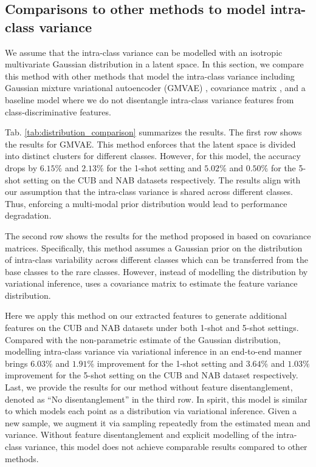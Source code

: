 \documentclass[10pt,twocolumn,letterpaper]{article}
\begin{document}
\subsection{Comparisons to other methods to model intra-class variance}

We assume that the intra-class variance can be modelled with an isotropic multivariate Gaussian distribution in a latent space.
In this section, we compare this method with other methods that model the intra-class variance including Gaussian mixture variational autoencoder (GMVAE) \cite{gmm_vae}, covariance matrix \cite{feature_transfer}, and a baseline model where we do not disentangle intra-class variance features from class-discriminative features.

Tab. \ref{tab:distribution_comparison} summarizes the results. The first row shows the results for GMVAE. This method enforces that the latent space is divided into distinct clusters for different classes. However, for this model, the accuracy drops by $6.15\%$ and $2.13\%$ for the 1-shot setting and $5.02\%$ and $0.50\%$ for the 5-shot setting on the CUB and NAB datasets respectively. The results align with our assumption that the intra-class variance is shared across different classes. Thus, enforcing a multi-modal prior distribution would lead to performance degradation. 

The second row shows the results for the method proposed in \cite{feature_transfer} based on covariance matrices.
Specifically, this method assumes a Gaussian prior on the distribution of intra-class variability across different classes which can be transferred from the base classes to the rare classes.
However, instead of modelling the distribution by variational inference, \cite{feature_transfer} uses a covariance matrix to estimate the feature variance distribution.
\begin{comment}
The augmented feature can then be calculated via:
$g_i = c_i + QQ^T(g_j-c_j)$, where $g_j$ and $c_j$ are the feature-level sample and the center of a regular class $j$.
$c_i$ is the feature center of an under-presented class $i$ and $g_i$ is the augmented feature for class $i$.
$Q$ is the estimated covariance matrix after PCA projection.
\end{comment}
Here we apply this method on our extracted features to generate additional features on the CUB and NAB datasets under both 1-shot and 5-shot settings.
Compared with the non-parametric estimate of the Gaussian distribution, modelling intra-class variance via variational inference in an end-to-end manner brings $6.03\%$ and $1.91\%$ improvement for the  1-shot setting and $3.64\%$ and $1.03\%$ improvement for the 5-shot setting on the CUB and NAB dataset respectively.
Last, we provide the results for our method without  feature disentanglement, denoted as ``No disentanglement'' in the third row. In spirit, this model is similar to \cite{variational_fewshot} which models each point as a distribution via variational inference. Given a new sample, we augment it via sampling repeatedly from the estimated mean and variance. 
Without feature disentanglement and explicit modelling of the intra-class variance, this model does not achieve comparable results compared to other methods. 
\end{document}
